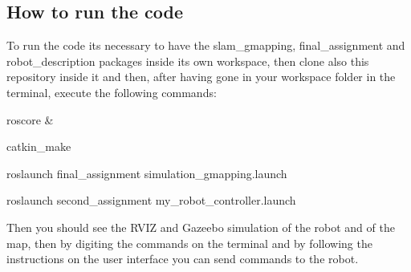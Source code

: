 \subsection*{How to run the code}

To run the code it\textquotesingle{}s necessary to have the slam\+\_\+gmapping, final\+\_\+assignment and robot\+\_\+description packages inside its own workspace, then clone also this repository inside it and then, after having gone in your workspace folder in the terminal, execute the following commands\+:


\begin{DoxyItemize}
\item roscore \&
\item catkin\+\_\+make
\item roslaunch final\+\_\+assignment simulation\+\_\+gmapping.\+launch
\item roslaunch second\+\_\+assignment my\+\_\+robot\+\_\+controller.\+launch
\end{DoxyItemize}

Then you should see the R\+V\+IZ and Gazeebo simulation of the robot and of the map, then by digiting the commands on the terminal and by following the instructions on the user interface you can send commands to the robot. 